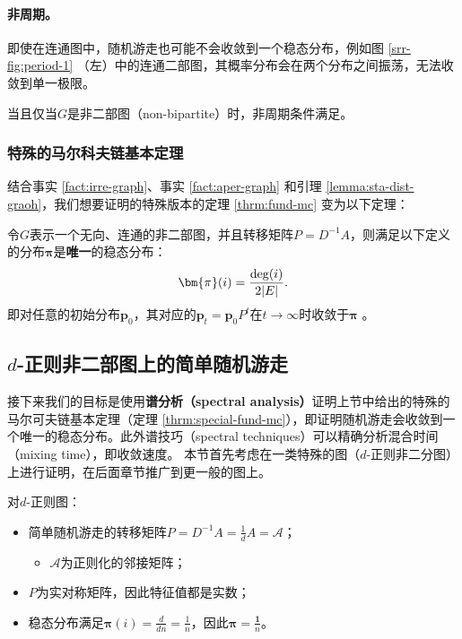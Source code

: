 \documentclass[lang=cn,newtx,10pt,scheme=chinese,chinesefont=nofont,citestyle=gb7714-2015, bibstyle=gb7714-2015]{elegantbook}
\begin{document}
\begin{refsection}
\paragraph{非周期。}即使在连通图中，随机游走也可能不会收敛到一个稳态分布，例如图 \ref{srr-fig:period-1} （左）中的连通二部图，其概率分布会在两个分布之间振荡，无法收敛到单一极限。

\begin{fact}
    \label{fact:aper-graph}
    当且仅当$G$是非二部图（non-bipartite）时，非周期条件满足。
\end{fact}



    \subsubsection{特殊的马尔科夫链基本定理}
        
    结合事实 \ref{fact:irre-graph}、事实 \ref{fact:aper-graph} 和引理 \ref{lemma:sta-dist-graoh}，我们想要证明的特殊版本的定理 \ref{thrm:fund-mc} 变为以下定理：

    \begin{theorem}
        \label{thrm:special-fund-mc}
        令$G$表示一个无向、连通的非二部图，并且转移矩阵$P=D^{-1}A$，则满足以下定义的分布$\bm{\pi}$是\textbf{唯一}的稳态分布：
        \[
            \bm{\pi}(i)=\frac{\textup{deg}(i)}{2|E|}.
        \]
        即对任意的初始分布$\bm{p}_0$，其对应的$\bm{p}_t=\bm{p}_0P^t$在$t\to \infty$时收敛于$\bm{\pi}$%
            。
    \end{theorem}
        


\subsection{\texorpdfstring{$d$}{d}-正则非二部图上的简单随机游走}

    接下来我们的目标是使用\textbf{谱分析（spectral analysis）}证明上节中给出的特殊的马尔可夫链基本定理（定理 \ref{thrm:special-fund-mc}），即证明随机游走会收敛到一个唯一的稳态分布。此外谱技巧（spectral techniques）可以精确分析混合时间（mixing time），即收敛速度。 本节首先考虑在一类特殊的图（$d$-正则非二分图）上进行证明，在后面章节推广到更一般的图上。

    对$d$-正则图：
    \begin{itemize}
        \item 简单随机游走的转移矩阵$P=D^{-1}A=\frac{1}{d}A=\mathcal{A}$；
        \begin{itemize}
            \item $\mathcal{A}$为正则化的邻接矩阵；
        \end{itemize}
        \item $P$为实对称矩阵，因此特征值都是实数；
        \item 稳态分布满足$\bm{\pi}(i)=\frac{d}{dn}=\frac{1}{n}$，因此$\bm{\pi}=\frac{\bm{1}}{n}$。
    \end{itemize}


\end{refsection}
\end{document}
